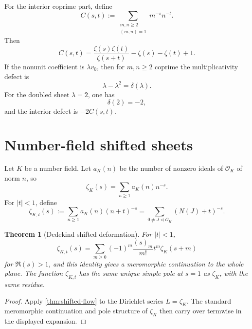 \documentclass[11pt]{article}
\newcommand{\1}{\mathbf 1}
\newtheorem{theorem}{Theorem}[section]
\numberwithin{equation}{section}
\begin{document}
For the interior coprime part, define
\begin{equation}
  C(s,t):=\sum_{\substack{m,n\ge2\\(m,n)=1}}m^{-s}n^{-t}.
\end{equation}
Then
\begin{equation}\label{eq:Cst}
  C(s,t)=\frac{\zeta(s)\zeta(t)}{\zeta(s+t)}-\zeta(s)-\zeta(t)+1.
\end{equation}
If the nonunit coefficient is $\lambda v_0$, then for $m,n\ge2$ coprime the multiplicativity defect is
\begin{equation}
  \lambda-\lambda^2=\delta(\lambda).
\end{equation}
For the doubled sheet $\lambda=2$, one has
\begin{equation}
  \delta(2)=-2,
\end{equation}
and the interior defect is $-2C(s,t)$.

\section{Number-field shifted sheets}\label{sec:number-field}

Let $K$ be a number field.  Let $a_K(n)$ be the number of nonzero ideals of $\mathcal O_K$ of norm $n$, so
\begin{equation}
  \zeta_K(s)=\sum_{n\ge1}a_K(n)n^{-s}.
\end{equation}
For $|t|<1$, define
\begin{equation}
  \zeta_{K,t}(s):=\sum_{n\ge1}a_K(n)(n+t)^{-s}
  =\sum_{0\ne J\triangleleft\mathcal O_K}(N(J)+t)^{-s}.
\end{equation}

\begin{theorem}[Dedekind shifted deformation]\label{thm:Dedekind-shift}
For $|t|<1$,
\begin{equation}
  \zeta_{K,t}(s)=\sum_{m\ge0}(-1)^m\frac{(s)_m}{m!}t^m\zeta_K(s+m)
\end{equation}
for $\Re(s)>1$, and this identity gives a meromorphic continuation to the whole plane.  The function $\zeta_{K,t}$ has the same unique simple pole at $s=1$ as $\zeta_K$, with the same residue.
\end{theorem}

\begin{proof}
Apply \cref{thm:shifted-flow} to the Dirichlet series $L=\zeta_K$.  The standard meromorphic continuation and pole structure of $\zeta_K$ then carry over termwise in the displayed expansion.
\end{proof}
\end{document}
